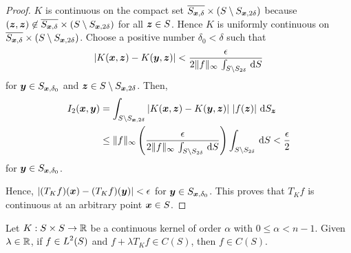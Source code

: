 \begin{proof}
$K$ is continuous on the compact set
$\overline{S_{{\bm{x}},\delta}} \times (S\setminus S_{{\bm{x}},2\delta})$ because
$({\bm{z}},{\bm{z}}) \not\in \overline{S_{{\bm{x}},\delta}}
\times (S\setminus S_{{\bm{x}},2\delta})$
for all ${\bm{z}}\in S$.  Hence $K$ is uniformly continuous on
$\overline{S_{{\bm{x}},\delta}} \times (S\setminus S_{{\bm{x}},2\delta})$.
Choose a positive number $\delta_0 < \delta$ such that
\[
|K({\bm{x}},{\bm{z}}) - K({\bm{y}},{\bm{z}})| <
\frac{\epsilon}{2 \|f\|_\infty \,\int_{S\setminus S_{2\delta}} \,\mathrm{d}{S}}
\]
for ${\bm{y}} \in S_{{\bm{x}},\delta_0}$ and
${\bm{z}} \in S\setminus S_{{\bm{x}},2\delta}$.  Then,
\begin{align*}
I_2({\bm{x}},{\bm{y}}) &= \int_{S\setminus S_{{\bm{x}},2\delta}}
\left| K({\bm{x}},{\bm{z}}) - K({\bm{y}},{\bm{z}})\right|\,
\left| f({\bm{z}}) \right|\,\mathrm{d}{S}_{{\bm{z}}} \\
&\leq \|f\|_{\infty}
\left( \frac{\epsilon}{2 \|f\|_\infty \,\int_{S\setminus S_{2\delta}} \,\mathrm{d}{S}}
\right) \int_{S\setminus S_{2\delta}}  \,\mathrm{d}{S}
< \frac{\epsilon}{2}
\end{align*}
for ${\bm{y}} \in S_{{\bm{x}},\delta_0}$.

 Hence,
$\displaystyle \left| (T_K f)({\bm{x}}) - (T_K f)({\bm{y}}) \right| < \epsilon$
for ${\bm{y}} \in S_{{\bm{x}},\delta_0}$.  This proves that $T_K f$ is continuous
at an arbitrary point ${\bm{x}}\in S$.
\end{proof}

\begin{prop} \label{pot_compt_cont_K}
Let $K:S\times S \rightarrow \mathbb{R}$ be a continuous kernel of order
$\alpha$ with $0\leq \alpha < n-1$.  Given $\lambda \in \mathbb{R}$, if
$\displaystyle f \in L^2(S)$ and $f + \lambda T_K f \in C(S)$,
 then $f \in C(S)$.
\end{prop}

